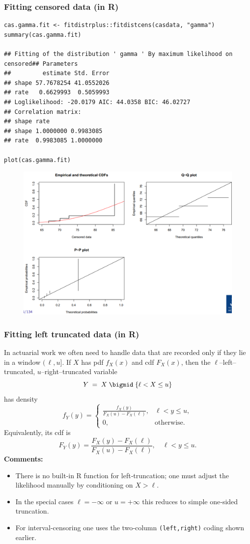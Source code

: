 \documentclass[11pt]{article}
\begin{document}
\subsubsection{Fitting censored data (in R)}
\begin{lstlisting}
cas.gamma.fit <- fitdistrplus::fitdistcens(casdata, "gamma")
summary(cas.gamma.fit)

## Fitting of the distribution ' gamma ' By maximum likelihood on censored## Parameters
##         estimate Std. Error
## shape 57.7678254 41.0552026
## rate   0.6629993  0.5059993
## Loglikelihood: -20.0179 AIC: 44.0358 BIC: 46.02727
## Correlation matrix:
## shape rate
## shape 1.0000000 0.9983085
## rate  0.9983085 1.0000000

plot(cas.gamma.fit)
\end{lstlisting}
\begin{figure}[H]
    \centering
    \includegraphics[width=0.7\linewidth]{right censor - fit data gamma.png}
\end{figure}

\subsubsection{Fitting left truncated data (in R)}
\noindent In actuarial work we often need to handle data that are recorded only if they lie in a window \((\,\ell,u]\).  If \(X\) has pdf \(f_X(x)\) and cdf \(F_X(x)\), then the \(\ell\)\!--left–truncated, \(u\)\!--right–truncated variable 
\[
Y \;=\; X \;\bigmid\; \{\ell<X\le u\}
\]
has density
\[
f_Y(y)
=\begin{cases}
\displaystyle
\frac{f_X(y)}{F_X(u)-F_X(\ell)}, 
&\ell<y\le u,\\[1em]
0,&\text{otherwise.}
\end{cases}
\]
Equivalently, its cdf is
\[
F_Y(y)=
\frac{F_X(y)-F_X(\ell)}{F_X(u)-F_X(\ell)},
\quad \ell<y\le u.
\]
\noindent\textbf{Comments:}
\begin{itemize}
  \item There is no built‐in R function for left‐truncation; one must adjust the likelihood manually by conditioning on \(X>\ell\).
  \item In the special cases \(\ell=-\infty\) or \(u=+\infty\) this reduces to simple one‐sided truncation.
  \item For interval‐censoring one uses the two‐column \texttt{(left,right)} coding shown earlier.
\end{itemize} \phantom{i}
\end{document}
